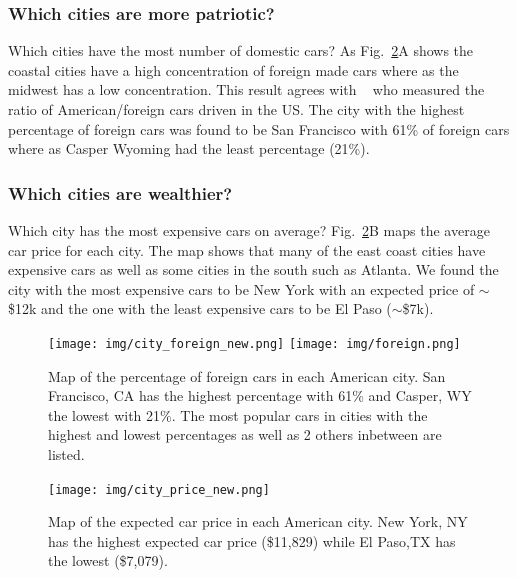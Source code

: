 \documentclass[10pt,twocolumn,letterpaper]{article}
\begin{document}
\subsubsection{Which cities are more patriotic?}
Which cities have the most number of domestic cars? As Fig.~\ref{fig:city_price}A shows the coastal cities have a high concentration of foreign made cars where as the midwest has a low concentration. This result agrees with ~\cite{foreign_domestic} who measured the ratio of American/foreign cars driven in the US. The city with the highest percentage of foreign cars was found to be San Francisco with 61\% of foreign cars where as Casper Wyoming had the least percentage (21\%).

\subsubsection{Which cities are wealthier?}
Which city has the most expensive cars on average? Fig.~\ref{fig:city_price}B maps the average car price for each city. The map shows that many of the east coast cities have expensive cars as well as some cities in the south such as Atlanta. We found the city with the most expensive cars to be New York with an expected price of \(\sim\)\$12k and the one with the least expensive cars to be El Paso (\(\sim\)\$7k). 

\begin{figure}[t]
\begin{center}
    \texttt{[image: img/city\_foreign\_new.png]}
    \texttt{[image: img/foreign.png]}
\end{center}
   \caption {Map of the percentage of foreign cars in each American city. San Francisco, CA has the highest percentage with 61\% and Casper, WY the lowest with 21\%. The most popular cars in cities with the highest and lowest percentages as well as 2 others inbetween are listed.} 
\label{fig:city_price}
\end{figure}

\begin{figure}[t]
\begin{center}
    \texttt{[image: img/city\_price\_new.png]}
\end{center}
   \caption {Map of the expected car price in each American city. New York, NY has the highest expected car price (\$11,829) while El Paso,TX has the lowest (\$7,079).}
\label{fig:city_price}
\end{figure}
\end{document}

